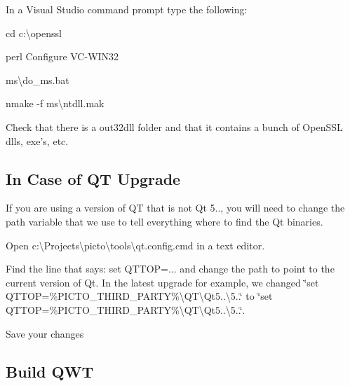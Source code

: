 \begin{DoxyEnumerate}
\item In a Visual Studio command prompt type the following\-:
\begin{DoxyEnumerate}
\item cd c\-:\textbackslash{}openssl
\item perl Configure V\-C-\/\-W\-I\-N32
\item ms\textbackslash{}do\-\_\-ms.\-bat
\item nmake -\/f ms\textbackslash{}ntdll.\-mak
\end{DoxyEnumerate}
\item Check that there is a out32dll folder and that it contains a bunch of Open\-S\-S\-L dlls, exe's, etc.
\end{DoxyEnumerate}\hypertarget{build_environment_preparation_qt_upgrade}{}\subsection{In Case of Q\-T Upgrade}\label{build_environment_preparation_qt_upgrade}

\begin{DoxyEnumerate}
\item If you are using a version of Q\-T that is not Qt 5.., you will need to change the path variable that we use to tell everything where to find the Qt binaries.
\begin{DoxyEnumerate}
\item Open c\-:\textbackslash{}Projects\textbackslash{}picto\textbackslash{}tools\textbackslash{}qt.\-config.cmd in a text editor.
\item Find the line that says\-: set Q\-T\-T\-O\-P=... and change the path to point to the current version of Qt. In the latest upgrade for example, we changed \char`\"{}set Q\-T\-T\-O\-P=\%\-P\-I\-C\-T\-O\-\_\-\-T\-H\-I\-R\-D\-\_\-\-P\-A\-R\-T\-Y\%\textbackslash{}\-Q\-T\textbackslash{}\-Qt5..\textbackslash{}5..\char`\"{} to \char`\"{}set Q\-T\-T\-O\-P=\%\-P\-I\-C\-T\-O\-\_\-\-T\-H\-I\-R\-D\-\_\-\-P\-A\-R\-T\-Y\%\textbackslash{}\-Q\-T\textbackslash{}\-Qt5..\textbackslash{}5..\char`\"{}.
\item Save your changes
\end{DoxyEnumerate}
\end{DoxyEnumerate}\hypertarget{build_environment_preparation_build_qwt}{}\subsection{Build Q\-W\-T}\label{build_environment_preparation_build_qwt}

